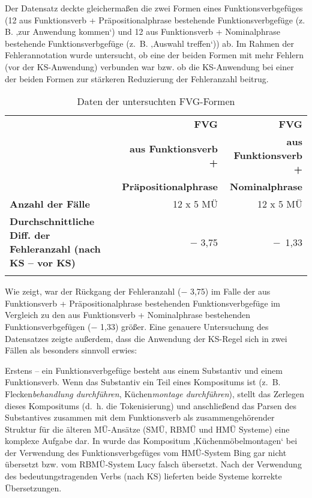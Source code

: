 Der Datensatz deckte gleichermaßen die zwei Formen eines Funktionsverbgefüges (12 aus Funktionsverb + Präpositionalphrase bestehende Funktionsverbgefüge (z. B. ‚zur Anwendung kommen‘) und 12 aus Funktionsverb + Nominalphrase bestehende Funktionsverbgefüge (z.~B. ‚Auswahl treffen‘)) ab. Im Rahmen der Fehlerannotation wurde untersucht, ob eine der beiden Formen mit mehr Fehlern (vor der KS-Anwendung) verbunden war bzw. ob die KS-Anwendung bei einer der beiden Formen zur stärkeren Reduzierung der Fehleranzahl beitrug.


\begin{table}
\begin{tabularx}{\textwidth}{Xrr}

\lsptoprule
& { \textbf{FVG}} & \textbf{FVG}\\
& \textbf{aus Funktionsverb +} & \textbf{aus Funktionsverb +}\\
& \textbf{Präpositionalphrase} & \textbf{Nominalphrase}\\
 \midrule
\textbf{Anzahl der Fälle} & 12 x 5 MÜ & 12 x 5 MÜ\\
\tablevspace
\textbf{Durchschnittliche Diff. der Fehleranzahl (nach KS – vor KS)} & { $-$ 3,75} & $-$~1,33\\
\lspbottomrule
\end{tabularx}
\caption{\label{tab:05:31}   Daten der untersuchten FVG-Formen}
\end{table}

Wie  zeigt, war der Rückgang der Fehleranzahl ($-$ 3,75) im Falle der aus Funktionsverb + Präpositionalphrase bestehenden Funktionsverbgefüge im Vergleich zu den aus Funktionsverb + Nominalphrase bestehenden Funktionsverbgefügen ($-$ 1,33) größer. Eine genauere Untersuchung des Datensatzes zeigte außerdem, dass die Anwendung der KS-Regel sich in zwei Fällen als besonders sinnvoll erwies:

Erstens -- ein Funktionsverbgefüge besteht aus einem Substantiv und einem Funktionsverb. Wenn das Substantiv ein Teil eines Kompositums ist (z.~B. Flecken\-\textit{behandlung durchführen}, Küchen\textit{montage durchführen}), stellt das Zerlegen dieses Kompositums (d.~h. die Tokenisierung) und anschließend das Parsen des Substantives zusammen mit dem Funktionsverb als zusammengehörender Struktur für die älteren MÜ-Ansätze (SMÜ, RBMÜ und HMÜ Systeme) eine komplexe Aufgabe dar. In  wurde das Kompositum ‚Küchenmöbelmontagen‘ bei der Verwendung des Funktionsverbgefüges vom HMÜ-System Bing gar nicht übersetzt bzw. vom RBMÜ-System Lucy falsch übersetzt. Nach der Verwendung des bedeutungstragenden Verbs (nach KS) lieferten beide Systeme korrekte Übersetzungen.


